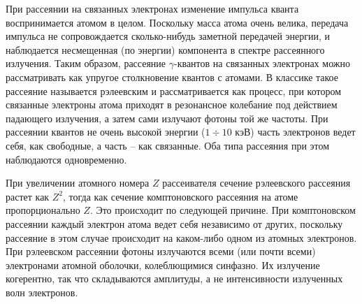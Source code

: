 \documentclass[a4paper, 12pt]{article}
\begin{document}
При рассеянии на связанных электронах изменение импульса кванта воспринимается атомом в целом. Поскольку масса атома очень велика, передача импульса не сопровождается сколько-нибудь заметной передачей энергии, и наблюдается несмещенная (по энергии) компонента в спектре рассеянного излучения. Таким образом, рассеяние $\gamma$-квантов на связанных электронах можно рассматривать как упругое столкновение квантов с атомами. В классике такое рассеяние называется рэлеевским и рассматривается как процесс, при котором связанные электроны атома приходят в резонансное колебание под действием падающего излучения, а затем сами излучают фотоны той же частоты. При рассеянии квантов не очень высокой энергии ($1\div 10$ кэВ) часть электронов ведет себя, как свободные, а часть -- как связанные. Оба типа рассеяния при этом наблюдаются одновременно.\par
При увеличении атомного номера $Z$ рассеивателя сечение рэлеевского рассеяния растет как $Z^2$, тогда как сечение комптоновского рассеяния на атоме пропорционально $Z$. Это происходит по следующей причине. При комптоновском рассеянии каждый электрон атома ведет себя независимо от других, поскольку рассеяние в этом случае происходит на каком-либо одном из атомных электронов. При рэлеевском рассеянии фотоны излучаются всеми (или почти всеми) электронами атомной оболочки, колеблющимися синфазно. Их излучение когерентно, так что складываются амплитуды, а не интенсивности излученных волн электронов.\par
\end{document}
